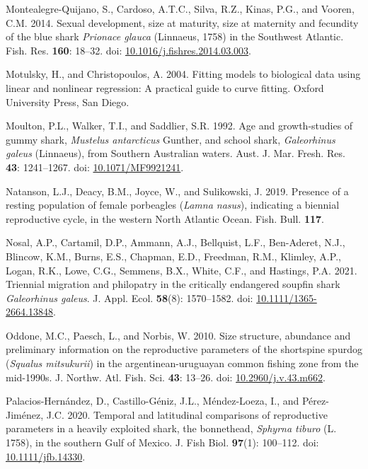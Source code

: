 \documentclass[
]{article}
\newenvironment{CSLReferences}%
  {}%
  {\par}
\begin{document}
\begin{CSLReferences}{1}{0}
Montealegre-Quijano, S., Cardoso, A.T.C., Silva, R.Z., Kinas, P.G., and Vooren, C.M. 2014. Sexual development, size at maturity, size at maternity and fecundity of the blue shark \emph{{Prionace} glauca} ({Linnaeus}, 1758) in the {Southwest} {Atlantic}. Fish. Res. \textbf{160}: 18--32. doi: \href{https://doi.org/10.1016/j.fishres.2014.03.003}{10.1016/j.fishres.2014.03.003}.

Motulsky, H., and Christopoulos, A. 2004. Fitting models to biological data using linear and nonlinear regression: A practical guide to curve fitting. Oxford University Press, San Diego.

Moulton, P.L., Walker, T.I., and Saddlier, S.R. 1992. Age and growth-studies of gummy shark, \emph{{Mustelus} antarcticus} {Gunther}, and school shark, \emph{{Galeorhinus} galeus} ({Linnaeus}), from {Southern} {Australian} waters. Aust. J. Mar. Fresh. Res. \textbf{43}: 1241--1267. doi: \href{https://doi.org/10.1071/MF9921241}{10.1071/MF9921241}.

Natanson, L.J., Deacy, B.M., Joyce, W., and Sulikowski, J. 2019. Presence of a resting population of female porbeagles (\emph{{Lamna} nasus}), indicating a biennial reproductive cycle, in the western {North} {Atlantic} {Ocean}. Fish. Bull. \textbf{117}.

Nosal, A.P., Cartamil, D.P., Ammann, A.J., Bellquist, L.F., Ben-Aderet, N.J., Blincow, K.M., Burns, E.S., Chapman, E.D., Freedman, R.M., Klimley, A.P., Logan, R.K., Lowe, C.G., Semmens, B.X., White, C.F., and Hastings, P.A. 2021. Triennial migration and philopatry in the critically endangered soupfin shark {\emph{Galeorhinus galeus}}. J. Appl. Ecol. \textbf{58}(8): 1570--1582. doi: \href{https://doi.org/10.1111/1365-2664.13848}{10.1111/1365-2664.13848}.

Oddone, M.C., Paesch, L., and Norbis, W. 2010. Size structure, abundance and preliminary information on the reproductive parameters of the shortspine spurdog (\emph{{Squalus} mitsukurii}) in the argentinean-uruguayan common fishing zone from the mid-1990s. J. Northw. Atl. Fish. Sci. \textbf{43}: 13--26. doi: \href{https://doi.org/10.2960/j.v.43.m662}{10.2960/j.v.43.m662}.

Palacios-Hernández, D., Castillo-Géniz, J.L., Méndez-Loeza, I., and Pérez-Jiménez, J.C. 2020. Temporal and latitudinal comparisons of reproductive parameters in a heavily exploited shark, the bonnethead, \emph{{Sphyrna} tiburo} ({L}. 1758), in the southern {Gulf} of {Mexico}. J. Fish Biol. \textbf{97}(1): 100--112. doi: \href{https://doi.org/10.1111/jfb.14330}{10.1111/jfb.14330}.


\end{CSLReferences}
\end{document}
